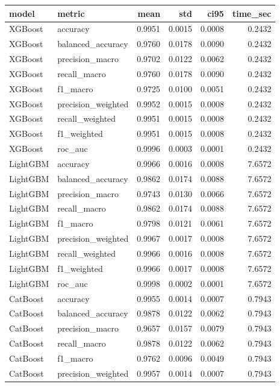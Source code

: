 \begin{tabular}{llrrrr}
\toprule
model & metric & mean & std & ci95 & time_sec \\
\midrule
XGBoost & accuracy & 0.9951 & 0.0015 & 0.0008 & 0.2432 \\
XGBoost & balanced_accuracy & 0.9760 & 0.0178 & 0.0090 & 0.2432 \\
XGBoost & precision_macro & 0.9702 & 0.0122 & 0.0062 & 0.2432 \\
XGBoost & recall_macro & 0.9760 & 0.0178 & 0.0090 & 0.2432 \\
XGBoost & f1_macro & 0.9725 & 0.0100 & 0.0051 & 0.2432 \\
XGBoost & precision_weighted & 0.9952 & 0.0015 & 0.0008 & 0.2432 \\
XGBoost & recall_weighted & 0.9951 & 0.0015 & 0.0008 & 0.2432 \\
XGBoost & f1_weighted & 0.9951 & 0.0015 & 0.0008 & 0.2432 \\
XGBoost & roc_auc & 0.9996 & 0.0003 & 0.0001 & 0.2432 \\
LightGBM & accuracy & 0.9966 & 0.0016 & 0.0008 & 7.6572 \\
LightGBM & balanced_accuracy & 0.9862 & 0.0174 & 0.0088 & 7.6572 \\
LightGBM & precision_macro & 0.9743 & 0.0130 & 0.0066 & 7.6572 \\
LightGBM & recall_macro & 0.9862 & 0.0174 & 0.0088 & 7.6572 \\
LightGBM & f1_macro & 0.9798 & 0.0121 & 0.0061 & 7.6572 \\
LightGBM & precision_weighted & 0.9967 & 0.0017 & 0.0008 & 7.6572 \\
LightGBM & recall_weighted & 0.9966 & 0.0016 & 0.0008 & 7.6572 \\
LightGBM & f1_weighted & 0.9966 & 0.0017 & 0.0008 & 7.6572 \\
LightGBM & roc_auc & 0.9998 & 0.0002 & 0.0001 & 7.6572 \\
CatBoost & accuracy & 0.9955 & 0.0014 & 0.0007 & 0.7943 \\
CatBoost & balanced_accuracy & 0.9878 & 0.0122 & 0.0062 & 0.7943 \\
CatBoost & precision_macro & 0.9657 & 0.0157 & 0.0079 & 0.7943 \\
CatBoost & recall_macro & 0.9878 & 0.0122 & 0.0062 & 0.7943 \\
CatBoost & f1_macro & 0.9762 & 0.0096 & 0.0049 & 0.7943 \\
CatBoost & precision_weighted & 0.9957 & 0.0014 & 0.0007 & 0.7943 \\

\end{tabular}
